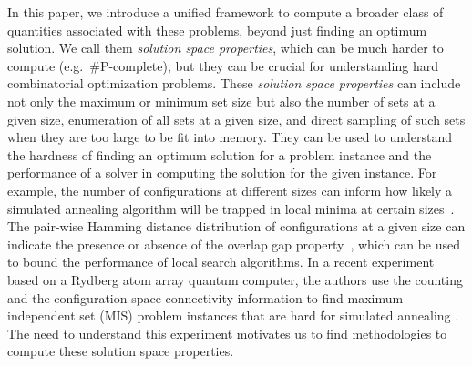 \documentclass[onefignum, onetabnum]{siamart190516}
\newcommand{\<}{\langle}
\renewcommand{\>}{\rangle}
\newcommand{\blue}[1]{[{\bf  \color{blue}{JG: #1}}]}
\newcommand{\purple}[1]{[{\bf  \color{purple}{MC: #1}}]}
\newcounter{example}
\begin{document}
In this paper, we introduce a unified framework to compute a broader class of quantities associated with these problems, beyond just finding an optimum solution.
We call them \textit{solution space properties}, which can be much harder to compute (e.g.\ \#P-complete), but they can be crucial for understanding hard combinatorial optimization problems.
These \textit{solution space properties} can include not only the maximum or minimum set size but also the number of sets at a given size, enumeration of all sets at a given size, and direct sampling of such sets when they are too large to be fit into memory.
They can be used to understand the hardness of finding an optimum solution for a problem instance and the performance of a solver in computing the solution for the given instance.
For example, the number of configurations at different sizes can inform how likely a simulated annealing algorithm will be trapped in local minima at certain sizes~\cite{Xu2018}.
The pair-wise Hamming distance distribution of configurations at a given size can indicate the presence or absence of the overlap gap property~\cite{Gamarnik2013, Gamarnik2019}, which can be used to bound the performance of local search algorithms.
In a recent experiment based on a Rydberg atom array quantum computer, the authors use the counting and the configuration space connectivity information to find maximum independent set (MIS) problem instances that are hard for simulated annealing \cite{Ebadi2022}.
The need to understand this experiment motivates us to find methodologies to compute these solution space properties.
\end{document}
